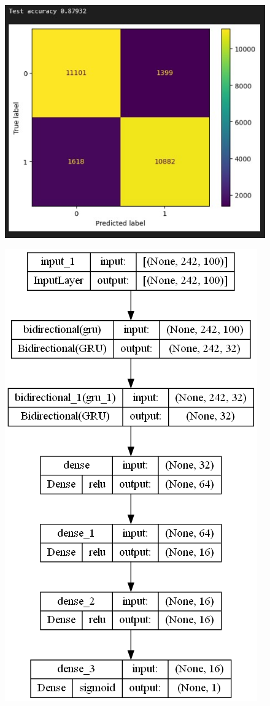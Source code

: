 \documentclass{article}
\begin{document}
\begin{figure}[!h]
    \centering\includegraphics[scale=.70]{./test-GRU-[16]}
    \caption{}\label{fig.49}
\end{figure}





\begin{figure}[!h]
    \centering\includegraphics[scale=.45]{./GRU-[16, 16]}
    \caption{}\label{fig.410}
\end{figure}
\end{document}
